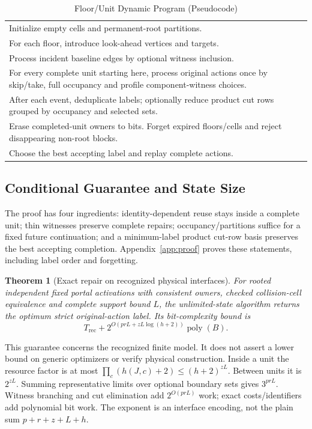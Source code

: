 \documentclass[conference]{IEEEtran}
\newtheorem{theorem}{Theorem}
\newcommand{\poly}{\operatorname{poly}}
\begin{document}
\begin{table}[t]
\caption{Floor/Unit Dynamic Program (Pseudocode)}\label{tab:algorithm}
\centering\begin{tabular}{p{}}
\toprule
Initialize empty cells and permanent-root partitions.\\
For each floor, introduce look-ahead vertices and targets.\\
Process incident baseline edges by optional witness inclusion.\\
For every complete unit starting here, process original actions once by skip/take, full occupancy and profile component-witness choices.\\
After each event, deduplicate labels; optionally reduce product cut rows grouped by occupancy and selected sets.\\
Erase completed-unit owners to bits. Forget expired floors/cells and reject disappearing non-root blocks.\\
Choose the best accepting label and replay complete actions.\\
\bottomrule\end{tabular}\end{table}

\subsection{Conditional Guarantee and State Size}
The proof has four ingredients: identity-dependent reuse stays inside a complete unit; thin witnesses preserve complete repairs; occupancy/partitions suffice for a fixed future continuation; and a minimum-label product cut-row basis preserves the best accepting completion. Appendix~\ref{app:proof} proves these statements, including label order and forgetting.

\begin{theorem}[Exact repair on recognized physical interfaces]
For rooted independent fixed portal activations with consistent owners, checked collision-cell equivalence and complete support bound $L$, the unlimited-state algorithm returns the optimum strict original-action label. Its bit-complexity bound is
\begin{equation}
T_{\mathrm{rec}}+2^{O(prL+zL\log(h+2))}\poly(B).
\label{eq:bound}
\end{equation}
\end{theorem}
This guarantee concerns the recognized finite model. It does not assert a lower bound on generic optimizers or verify physical construction. Inside a unit the resource factor is at most $\prod_c(h(J,c)+2)\le(h+2)^{zL}$. Between units it is $2^{zL}$. Summing representative limits over optional boundary sets gives $3^{prL}$. Witness branching and cut elimination add $2^{O(prL)}$ work; exact costs/identifiers add polynomial bit work. The exponent is an interface encoding, not the plain sum $p+r+z+L+h$.
\end{document}
